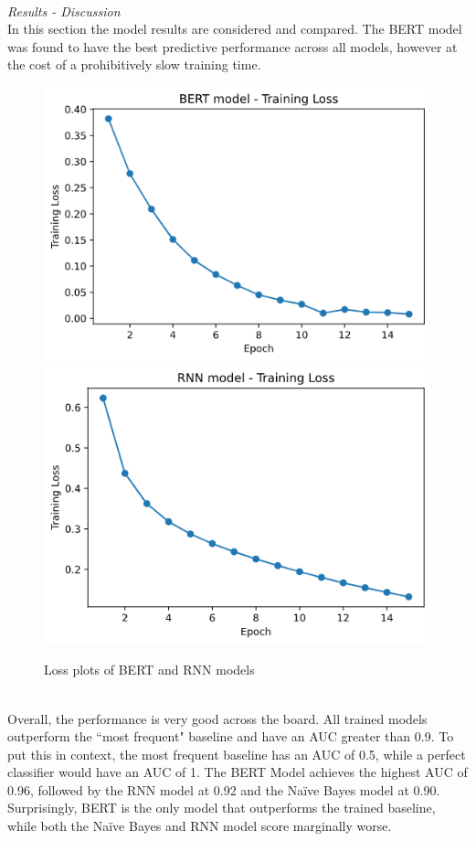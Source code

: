 \documentclass{svproc}
\begin{document}
\newpage
\\
\textit{Results - Discussion}
\\ In this section the model results are considered and compared. The BERT model was found to have the best predictive performance across all models, however at the cost of a prohibitively slow training time.
\\
\begin{figure}
  \centering
    \includegraphics[scale=0.31]{BERT_loss.PNG}
\includegraphics[scale=0.31]{RNN_loss.PNG}
    \caption{Loss plots of BERT and RNN models}
\end{figure}
\\
Overall, the performance is very good across the board. All trained models outperform the ``most frequent" baseline and have an AUC greater than 0.9. To put this in context, the most frequent baseline has an AUC of 0.5, while a perfect classifier would have an AUC of 1. The BERT Model achieves the highest AUC of 0.96, followed by the RNN model at 0.92 and the Naïve Bayes model at 0.90. Surprisingly, BERT is the only model that outperforms the trained baseline, while both the Naïve Bayes and RNN model score marginally worse.
\end{document}
